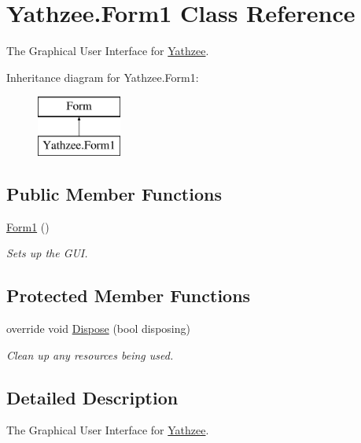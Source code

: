 \hypertarget{class_yathzee_1_1_form1}{}\section{Yathzee.\+Form1 Class Reference}
\label{class_yathzee_1_1_form1}


The Graphical User Interface for \hyperlink{namespace_yathzee}{Yathzee}.  


Inheritance diagram for Yathzee.\+Form1\+:\begin{figure}[H]
\begin{center}
\leavevmode
\includegraphics[height=2.000000cm]{class_yathzee_1_1_form1}
\end{center}
\end{figure}
\subsection*{Public Member Functions}
\begin{DoxyCompactItemize}
\item 
\hyperlink{class_yathzee_1_1_form1_a72fd0c431a8f1bbfae37f57917046763}{Form1} ()
\begin{DoxyCompactList}\small\item\em Sets up the G\+UI. \end{DoxyCompactList}\end{DoxyCompactItemize}
\subsection*{Protected Member Functions}
\begin{DoxyCompactItemize}
\item 
override void \hyperlink{class_yathzee_1_1_form1_a481d2704c1eb9c036cd9389d3dd866cb}{Dispose} (bool disposing)
\begin{DoxyCompactList}\small\item\em Clean up any resources being used. \end{DoxyCompactList}\end{DoxyCompactItemize}


\subsection{Detailed Description}
The Graphical User Interface for \hyperlink{namespace_yathzee}{Yathzee}. 



